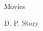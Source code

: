 \documentclass{article}
\begin{document}
\null\vspace{-\baselineskip}\vfill
{}
\par\medskip
{\color{blue}\gdb Movies}
\par\vfill
\gdbss\color{black}D. P. Story

\bigskip
\end{document}
